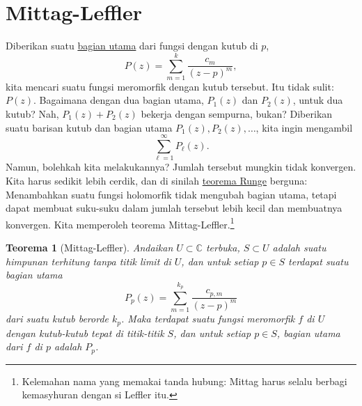 \documentclass[12pt,openany]{book}
\newcommand{\C}{{\mathbb{C}}}
\theoremstyle{plain}
\newtheorem{thm}{Teorema}[section]
\theoremstyle{remark}
\theoremstyle{definition}
\theoremstyle{exercise}
\theoremstyle{example}
\begin{document}

\section{Mittag-Leffler}
\label{sec:mittaglefler}

Diberikan suatu \hyperref[defn:principalpart]{bagian utama} dari fungsi dengan kutub di $p$,
\begin{equation*}
P(z) = \sum_{m=1}^{k} \frac{c_m}{{(z-p)}^m} ,
\end{equation*}
kita mencari suatu fungsi meromorfik dengan kutub tersebut.  Itu
tidak sulit: $P(z)$.  Bagaimana dengan dua bagian utama, $P_1(z)$ dan $P_2(z)$,
untuk dua kutub?  Nah, $P_1(z)+P_2(z)$ bekerja dengan sempurna, bukan?
Diberikan suatu barisan kutub dan bagian utama
$P_1(z),P_2(z),\ldots$, kita ingin mengambil
\begin{equation*}
\sum_{\ell=1}^\infty P_\ell(z) .
\end{equation*}
Namun, bolehkah kita melakukannya?  Jumlah tersebut mungkin tidak konvergen.  Kita harus sedikit
lebih cerdik, dan di sinilah \hyperref[cor:rungeseq]{teorema Runge} berguna:  Menambahkan
suatu fungsi holomorfik tidak mengubah bagian utama, tetapi dapat membuat
suku-suku dalam jumlah tersebut lebih kecil dan membuatnya konvergen.
Kita memperoleh
teorema Mittag-Leffler.\footnote{Kelemahan nama yang memakai tanda hubung:
Mittag harus selalu berbagi kemasyhuran dengan si Leffler itu.}

\begin{thm}[Mittag-Leffler]
Andaikan $U \subset \C$ terbuka, $S \subset U$ adalah suatu himpunan terhitung tanpa
titik limit di $U$, dan untuk setiap $p \in S$ terdapat suatu bagian utama
\begin{equation*}
P_p(z) = \sum_{m=1}^{k_p} \frac{c_{p,m}}{{(z-p)}^m}
\end{equation*}
dari suatu kutub berorde $k_p$.  Maka terdapat suatu fungsi meromorfik $f$ di $U$
dengan kutub-kutub tepat di titik-titik $S$, dan untuk setiap $p \in S$,
bagian utama dari $f$ di $p$ adalah $P_p$.
\end{thm}
\end{document}
